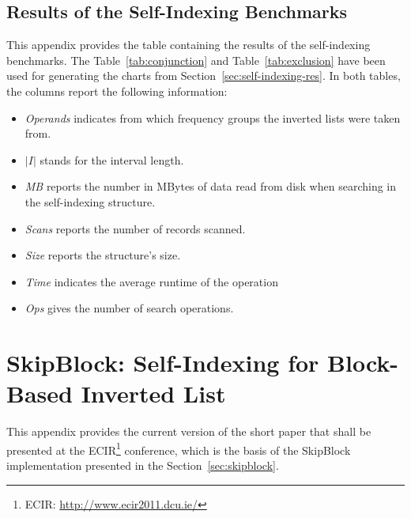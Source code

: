

\section{Results of the Self-Indexing Benchmarks}
\label{app:self-indexing:results}

This appendix provides the table containing the results of the self-indexing
benchmarks. The Table~\ref{tab:conjunction} and Table~\ref{tab:exclusion} have
been used for generating the charts from Section~\ref{sec:self-indexing-res}.
In both tables, the columns report the following information:
\begin{itemize}
\item \emph{Operands} indicates from which frequency groups the inverted lists
were taken from.
\item $\vert I \vert$ stands for the interval length.
\item \emph{MB} reports the number in MBytes of data read from disk when
searching in the self-indexing structure.
\item \emph{Scans} reports the number of records scanned.
\item \emph{Size} reports the structure's size.
\item \emph{Time} indicates the average runtime of the operation
\item \emph{Ops} gives the number of search operations.
\end{itemize}





\chapter{SkipBlock: Self-Indexing for Block-Based Inverted List}
\label{app:SkipBlock-paper}

This appendix provides the current version of the short paper that shall be
presented at the ECIR\footnote{ECIR:
\url{http://www.ecir2011.dcu.ie/}} conference, which is the basis of the
SkipBlock implementation presented in the Section~\ref{sec:skipblock}.


